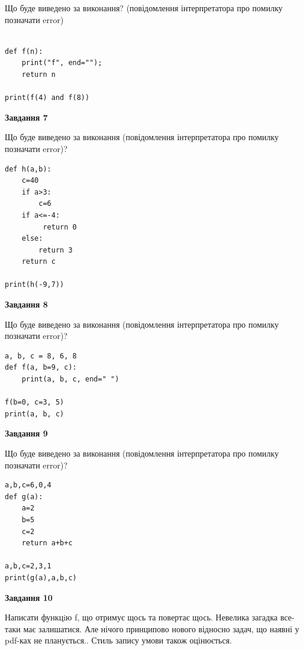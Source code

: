 \documentclass[12pt, ukrainian]{article}
\begin{document}
{\begin {large}
Що буде виведено за виконання? (повідомлення інтерпретатора про помилку позначати error)\par
\begin{verbatim}

def f(n):
    print("f", end="");
    return n

print(f(4) and f(8))
\end{verbatim}

{\begin {center}\textbf{Завдання 7}\end {center}}

Що буде виведено за виконання (повідомлення інтерпретатора про помилку позначати error)?\par
\begin{verbatim}
def h(a,b):
    c=40
    if a>3:
        c=6
    if a<=-4:
         return 0
    else: 
        return 3
    return c

print(h(-9,7))
\end{verbatim}

{\begin {center}\textbf{Завдання 8}\end {center}}

Що буде виведено за виконання (повідомлення інтерпретатора про помилку позначати error)?\par
\begin{verbatim}
a, b, c = 8, 6, 8
def f(a, b=9, c):
    print(a, b, c, end=" ")

f(b=0, c=3, 5)
print(a, b, c)
\end{verbatim}

{\begin {center}\textbf{Завдання 9}\end {center}}

Що буде виведено за виконання (повідомлення інтерпретатора про помилку позначати error)?\par
\begin{verbatim}
a,b,c=6,0,4
def g(a):
    a=2
    b=5
    c=2
    return a+b+c

a,b,c=2,3,1
print(g(a),a,b,c)
\end{verbatim}

{\begin {center}\textbf{Завдання 10}\end {center}}


Написати функцiю f, що отримує щось та повертає щось. Невелика загадка все-таки має залишатися. Але нічого принципово нового відносно задач, що наявні у pdf-ках не планується.. Стиль запису умови також оцінюється.\par
\end {large}}
\newpage
\end{document}
